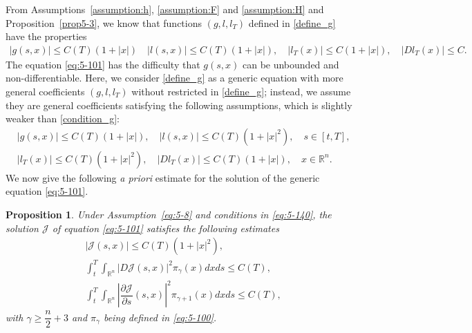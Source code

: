 \documentclass[11pt]{article}
\numberwithin{equation}{section}
\newtheorem{proposition}[theorem]{Proposition}
\newcommand{\brn}{{\mathbb{R}^n}}
\newcommand{\1}{\mbox{1\hspace{-1mm}I}}
\begin{document}
From Assumptions~\ref{assumption:h}, \ref{assumption:F} and \ref{assumption:H} and Proposition~\ref{prop5-3}, we know that functions $(g,l,l_T)$ defined in \eqref{define_g} have the properties
\begin{align}\label{condition_g}
    |g(s,x)|\le C(T)(1+|x|)\quad |l(s,x)|\leq C(T)(1+|x|),\quad |l_{T}(x)|\leq C(1+|x|),\quad |Dl_{T}(x)|\leq C.
\end{align}
The equation \eqref{eq:5-101} has the difficulty that $g(s,x)$ can be unbounded and non-differentiable. Here, we consider \eqref{define_g} as a generic equation with more general coefficients $(g,l,l_T)$ without restricted in \eqref{define_g}; instead, we assume they are general coefficients satisfying the following assumptions, which is slightly weaker than \eqref{condition_g}:
\begin{equation}\label{eq:5-140}
\begin{aligned}
    &|g(s,x)|\leq C(T)(1+|x|),\quad |l(s,x)|\leq C(T)(1+|x|^{2}),\quad s\in[t,T],\\
    &|l_{T}(x)|\leq C(T)(1+|x|^{2}),\quad |Dl_{T}(x)|\le C(T)(1+|x|),\quad x\in\brn.
\end{aligned}
\end{equation}
We now give the following \textit{a priori} estimate for the solution of the generic equation \eqref{eq:5-101}.

\begin{proposition}\label{prop5-5}
Under Assumption~\ref{eq:5-8} and conditions in \eqref{eq:5-140}, the solution $\mathcal{J}$ of equation \eqref{eq:5-101} satisfies the following estimates
\begin{align}
    &|\mathcal{J}(s,x)|\le C(T)\left(1+|x|^{2}\right), \label{eq:5-130}\\
    &\int_{t}^{T}\int_{\brn}|D\mathcal{J}(s,x)|^{2}\pi_{\gamma}(x)dxds\le C(T), \label{eq:5-106} \\
    &\int_{t}^{T}\int_{\brn}\left|\dfrac{\partial \mathcal{J}}{\partial s}(s,x)\right|^{2}\pi_{\gamma+1}(x)dxds\le C(T), \label{eq:5-107}
\end{align}
with $\gamma\geq\dfrac{n}{2}+3$ and $\pi_\gamma$ being defined in \eqref{eq:5-100}.
\end{proposition}
\end{document}

